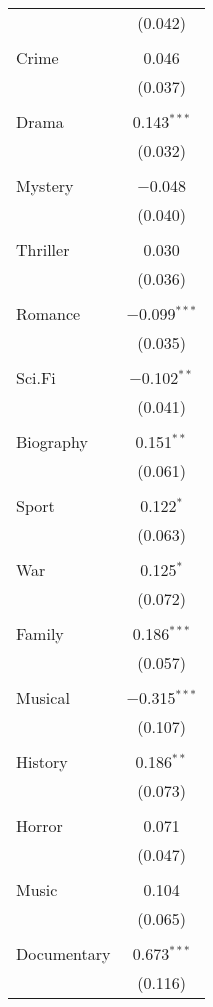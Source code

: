 \begin{table}[!htbp]
\begin{tabular}{@{\extracolsep{5pt}}lc}
  & (0.042) \\ 
  & \\ 
 Crime & 0.046 \\ 
  & (0.037) \\ 
  & \\ 
 Drama & 0.143$^{***}$ \\ 
  & (0.032) \\ 
  & \\ 
 Mystery & $-$0.048 \\ 
  & (0.040) \\ 
  & \\ 
 Thriller & 0.030 \\ 
  & (0.036) \\ 
  & \\ 
 Romance & $-$0.099$^{***}$ \\ 
  & (0.035) \\ 
  & \\ 
 Sci.Fi & $-$0.102$^{**}$ \\ 
  & (0.041) \\ 
  & \\ 
 Biography & 0.151$^{**}$ \\ 
  & (0.061) \\ 
  & \\ 
 Sport & 0.122$^{*}$ \\ 
  & (0.063) \\ 
  & \\ 
 War & 0.125$^{*}$ \\ 
  & (0.072) \\ 
  & \\ 
 Family & 0.186$^{***}$ \\ 
  & (0.057) \\ 
  & \\ 
 Musical & $-$0.315$^{***}$ \\ 
  & (0.107) \\ 
  & \\ 
 History & 0.186$^{**}$ \\ 
  & (0.073) \\ 
  & \\ 
 Horror & 0.071 \\ 
  & (0.047) \\ 
  & \\ 
 Music & 0.104 \\ 
  & (0.065) \\ 
  & \\ 
 Documentary & 0.673$^{***}$ \\ 
  & (0.116) \\ 

\end{tabular}
\end{table}
